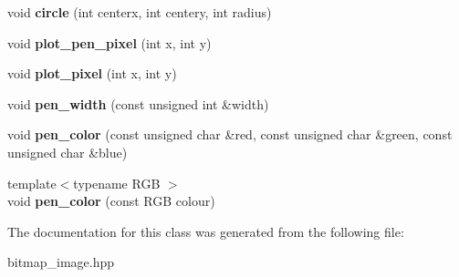 \begin{DoxyCompactItemize}
\item 
\mbox{\label{classimage__drawer_a43eb436bf038a32ae1498286c57ad9be}} 
void {\bfseries circle} (int centerx, int centery, int radius)
\item 
\mbox{\label{classimage__drawer_ab15fa10beb69acd6ede8bae0a27d728b}} 
void {\bfseries plot\+\_\+pen\+\_\+pixel} (int x, int y)
\item 
\mbox{\label{classimage__drawer_a2db1cd9efedadef5592130fe0cee688f}} 
void {\bfseries plot\+\_\+pixel} (int x, int y)
\item 
\mbox{\label{classimage__drawer_a5d8e5454398d7653880557aa97dbc0b1}} 
void {\bfseries pen\+\_\+width} (const unsigned int \&width)
\item 
\mbox{\label{classimage__drawer_a008d19f5706d83ddea29c65fa7247286}} 
void {\bfseries pen\+\_\+color} (const unsigned char \&red, const unsigned char \&green, const unsigned char \&blue)
\item 
\mbox{\label{classimage__drawer_a8cdb6cce3307875a733ad851159b20f6}} 
{\footnotesize template$<$typename R\+GB $>$ }\\void {\bfseries pen\+\_\+color} (const R\+GB colour)
\end{DoxyCompactItemize}


The documentation for this class was generated from the following file\+:\begin{DoxyCompactItemize}
\item 
bitmap\+\_\+image.\+hpp\end{DoxyCompactItemize}
